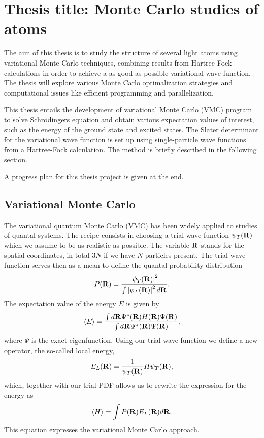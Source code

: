 \newcommand{\OP}[1]{{\bf\widehat{#1}}}

\newcommand{\be}{\begin{equation}}

\newcommand{\ee}{\end{equation}}



\pagestyle{plain}

\section*{Thesis title: Monte Carlo studies of atoms}

The aim of this thesis is to study the structure of several light atoms using
variational Monte Carlo techniques, combining results
from Hartree-Fock calculations in order to achieve a as good as possible
variational wave function. The thesis will explore various Monte Carlo
optimalization strategies and computational issues like efficient programming 
and parallelization.

This thesis 
entails the development of variational Monte Carlo (VMC)
program to solve Schr\"odingers equation
and obtain various expectation values of interest, such as the energy
of the ground state and excited states. 
The Slater determinant for the variational wave function is set up using
single-particle wave functions from a Hartree-Fock calculation.
The method is briefly described in the following section.

A progress plan for this thesis project is given at the end.

\subsection*{Variational Monte Carlo}
The variational quantum Monte Carlo (VMC) has been widely applied 
to studies of quantal systems. 
The recipe consists in choosing 
a trial wave function
$\psi_T({\bf R})$ which we assume to be as realistic as possible. 
The variable ${\bf R}$ stands for the spatial coordinates, in total 
$3N$ if we have $N$ particles present. 
The trial wave function serves then as
a mean to define the quantal probability distribution 
\be
   P({\bf R})= \frac{\left|\psi_T({\bf R})\right|^2}{\int \left|\psi_T({\bf R})\right|^2d{\bf R}}.
\ee
The expectation value of the energy $E$
is given by
\be
   \langle E \rangle =
   \frac{\int d{\bf R}\Psi^{\ast}({\bf R})H({\bf R})\Psi({\bf R})}
        {\int d{\bf R}\Psi^{\ast}({\bf R})\Psi({\bf R})},
\ee
where $\Psi$ is the exact eigenfunction. Using our trial
wave function we define a new operator, 
the so-called  
local energy, 
\be
   E_L({\bf R})=\frac{1}{\psi_T({\bf R})}H\psi_T({\bf R}),
   \label{eq:locale1}
\ee
which, together with our trial PDF allows us to rewrite the 
expression for the energy as
\be
  \langle H \rangle =\int P({\bf R})E_L({\bf R}) d{\bf R}.
  \label{eq:vmc1}
\ee
This equation expresses the variational Monte Carlo approach.

